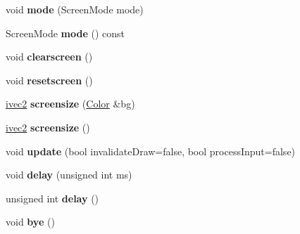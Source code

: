 \begin{DoxyCompactItemize}
\mbox{\label{classcturtle_1_1OfflineTurtleScreen_a552d6329a3789fa63a4409e8617f32a4}} 
void {\bfseries mode} (Screen\+Mode mode)
\item 
\mbox{\label{classcturtle_1_1OfflineTurtleScreen_a5ec9530b0de0078f37b7f087919e15eb}} 
Screen\+Mode {\bfseries mode} () const
\item 
\mbox{\label{classcturtle_1_1OfflineTurtleScreen_a5cdf4a2fc628d82360c88f1dd46b5b83}} 
void {\bfseries clearscreen} ()
\item 
\mbox{\label{classcturtle_1_1OfflineTurtleScreen_ac931e12c3175f470d5f248240b6124ae}} 
void {\bfseries resetscreen} ()
\item 
\mbox{\label{classcturtle_1_1OfflineTurtleScreen_ab13caf4652a65caf140de4e04428362a}} 
\hyperlink{structcturtle_1_1ivec2}{ivec2} {\bfseries screensize} (\hyperlink{classcturtle_1_1Color}{Color} \&bg)
\item 
\mbox{\label{classcturtle_1_1OfflineTurtleScreen_ad40a67b4c44acc97bbcaea3964d0e790}} 
\hyperlink{structcturtle_1_1ivec2}{ivec2} {\bfseries screensize} ()
\item 
\mbox{\label{classcturtle_1_1OfflineTurtleScreen_adcb37ff548b6d48c574f729fc82d5b9a}} 
void {\bfseries update} (bool invalidate\+Draw=false, bool process\+Input=false)
\item 
\mbox{\label{classcturtle_1_1OfflineTurtleScreen_ae318674423ce7c2dcf7da4f0545e3c9f}} 
void {\bfseries delay} (unsigned int ms)
\item 
\mbox{\label{classcturtle_1_1OfflineTurtleScreen_a60268e5b941db667020937ed9e7cb6c5}} 
unsigned int {\bfseries delay} ()
\item 
\mbox{\label{classcturtle_1_1OfflineTurtleScreen_a330a1ee1756a41dc2c36ee5ceb711d09}} 
void {\bfseries bye} ()

\end{DoxyCompactItemize}
